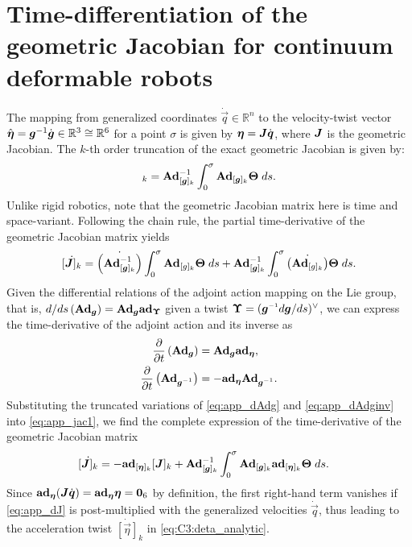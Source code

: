 
\section{Time-differentiation of the geometric Jacobian for continuum deformable robots} 
\label{app:C3:jacobian}
The mapping from generalized coordinates $\dot{\vec{q}} \in \mathbb{R}^n$ to the velocity-twist vector $\hat{\boldsymbol{\eta}} = \boldsymbol{g}^{-1} \dot{\boldsymbol{g}} \in \mathbb{R}^3 \cong \mathbb{R}^6$ for a point $\sigma$ is given by $\boldsymbol{\eta} = \boldsymbol{J}\dot{\boldsymbol{q}}$, where $\boldsymbol{J}$ is the geometric Jacobian. The $k$-th order truncation of the exact geometric Jacobian is given by:
%
\begin{equation}
[\mat{J}]_k = \Ad_{{[\mat{g}]_k}}^{-1} \int_0^\sigma \Ad_{[\mat{g}]_k} \mat{\Theta} \; ds. \label{eq:app_jac0}
\end{equation}
Unlike rigid robotics, note that the geometric Jacobian matrix here is time and space-variant. Following the chain rule, the partial time-derivative of the geometric Jacobian matrix yields
%
\begin{equation}
\dot{[\boldsymbol{J}]_k} = \dot{\left(\textbf{Ad}_{{[\boldsymbol{g}]_k}}^{-1}\right)} \int_0^\sigma \textbf{Ad}_{[g]_k} \boldsymbol{\Theta} \; ds + \textbf{Ad}_{{[\boldsymbol{g}]_k}}^{-1} \int_0^\sigma \dot{\left(\textbf{Ad}_{[g]_k}\right)} \boldsymbol{\Theta} \; ds. \label{eq:app_jac1}
\end{equation}
%
Given the differential relations of the adjoint action mapping on the Lie group, that is, ${d/ds}\left(\textbf{Ad}_{\boldsymbol{g}} \right) = \textbf{Ad}_{\boldsymbol{g}} \textbf{ad}_{\boldsymbol{\Upsilon}}$ given a twist $\vec{\Upsilon} = (\mat{g}\inv d\mat{g}/ds)^\vee$, we can express the time-derivative of the adjoint action and its inverse as
%
\begin{align}
\frac{\p}{\p t}\left(\Ad_{\mat{g}} \right) & = \Ad_{\mat{g}} \ad_{\vec{\eta}}, \label{eq:app_dAdg}\\
\frac{\p}{\p t}\left(\Ad_{\mat{g}\inv} \right) & = -\ad_{\vec{\eta}}\Ad_{\mat{g}\inv}. \label{eq:app_dAdginv}
\end{align}
%
Substituting the truncated variations of \eqref{eq:app_dAdg} and \eqref{eq:app_dAdginv} into \eqref{eq:app_jac1}, we find the complete expression of the time-derivative of the geometric Jacobian matrix
%
\begin{align}
\dot{[\boldsymbol{J}]_k} & = -\textbf{ad}_{[\boldsymbol{\eta}]_k} {[\boldsymbol{J}]_k} + \textbf{Ad}_{{[\boldsymbol{g}]_k}}^{-1} \int_0^\sigma \textbf{Ad}_{{[\boldsymbol{g}]_k}} \textbf{ad}_{[\boldsymbol{\eta}]_k} \boldsymbol{\Theta}\; ds. \label{eq:app_dJ}
\end{align}
%
Since $\textbf{ad}_{\boldsymbol{\eta}} (\boldsymbol{J} \dot{\boldsymbol{q}}) = \textbf{ad}_{\boldsymbol{\eta}} \boldsymbol{\eta} = \boldsymbol{0}_6$ by definition, the first right-hand term vanishes if \eqref{eq:app_dJ} is post-multiplied with the generalized velocities $\dot{\vec{q}}$, thus leading to the acceleration twist $\dot{[\vec{\eta}]}_k$ in \eqref{eq:C3:deta_analytic}. 

